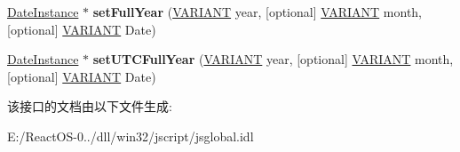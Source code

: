 \begin{DoxyCompactItemize}
\item 
\mbox{\label{interface_j_s_global_1_1_date_instance_af2d8212db5526f4fa577c81d424cf36d}} 
\hyperlink{interface_j_s_global_1_1_date_instance}{Date\+Instance} $\ast$ {\bfseries set\+Full\+Year} (\hyperlink{structtag_v_a_r_i_a_n_t}{V\+A\+R\+I\+A\+NT} year, \mbox{[}optional\mbox{]} \hyperlink{structtag_v_a_r_i_a_n_t}{V\+A\+R\+I\+A\+NT} month, \mbox{[}optional\mbox{]} \hyperlink{structtag_v_a_r_i_a_n_t}{V\+A\+R\+I\+A\+NT} Date)
\item 
\mbox{\label{interface_j_s_global_1_1_date_instance_a9c87ffb9b8b66de6e75d922641d92c05}} 
\hyperlink{interface_j_s_global_1_1_date_instance}{Date\+Instance} $\ast$ {\bfseries set\+U\+T\+C\+Full\+Year} (\hyperlink{structtag_v_a_r_i_a_n_t}{V\+A\+R\+I\+A\+NT} year, \mbox{[}optional\mbox{]} \hyperlink{structtag_v_a_r_i_a_n_t}{V\+A\+R\+I\+A\+NT} month, \mbox{[}optional\mbox{]} \hyperlink{structtag_v_a_r_i_a_n_t}{V\+A\+R\+I\+A\+NT} Date)
\end{DoxyCompactItemize}


该接口的文档由以下文件生成\+:\begin{DoxyCompactItemize}
\item 
E\+:/\+React\+O\+S-\/0../dll/win32/jscript/jsglobal.\+idl\end{DoxyCompactItemize}
